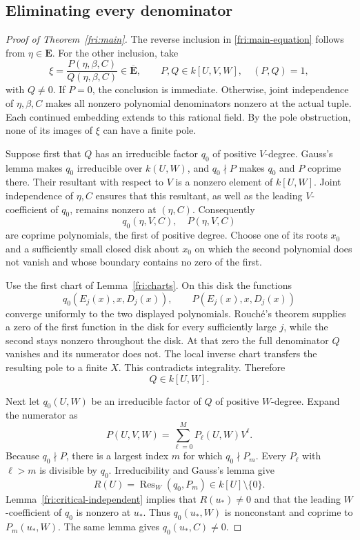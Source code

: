 \documentclass[11pt]{article}
\theoremstyle{definition}
\theoremstyle{remark}
\begin{document}
\subsection{Eliminating every denominator}

\begin{proof}[Proof of Theorem~\ref{fri:main}]
The reverse inclusion in \eqref{fri:main-equation} follows from
$\eta\in\mathbf E$.  For the other inclusion, take
\[
 \xi=\frac{P(\eta,\beta,C)}{Q(\eta,\beta,C)}
       \in\overline{\mathbf E},
 \qquad P,Q\in k[U,V,W],\quad (P,Q)=1,
\]
with $Q\ne0$.  If $P=0$, the conclusion is immediate.  Otherwise,
joint independence of $\eta,\beta,C$ makes all nonzero polynomial
denominators nonzero at the actual tuple.  Each continued embedding
extends to this rational field.  By the pole obstruction, none of
its images of $\xi$ can have a finite pole.

Suppose first that $Q$ has an irreducible factor $q_0$ of positive
$V$-degree.  Gauss's lemma makes $q_0$ irreducible over $k(U,W)$,
and $q_0\nmid P$ makes $q_0$ and $P$ coprime there.  Their resultant
with respect to $V$ is a nonzero element of $k[U,W]$.  Joint
independence of $\eta,C$ ensures that this resultant, as well as
the leading $V$-coefficient of $q_0$, remains nonzero at $(\eta,C)$.
Consequently
\[
 q_0(\eta,V,C),\quad P(\eta,V,C)
\]
are coprime polynomials, the first of positive degree.
Choose one of its roots $x_0$ and a sufficiently small closed disk
about $x_0$ on which the second polynomial does not vanish and whose
boundary contains no zero of the first.

Use the first chart of Lemma~\ref{fri:charts}.  On this disk the
functions
\[
 q_0(E_j(x),x,D_j(x)),\qquad P(E_j(x),x,D_j(x))
\]
converge uniformly to the two displayed polynomials.  Rouch\'e's
theorem supplies a zero of the first function in the disk for every
sufficiently large $j$, while the second stays nonzero throughout
the disk.  At that zero the full denominator $Q$ vanishes and its
numerator does not.  The local inverse chart transfers the resulting
pole to a finite $X$.  This contradicts integrality.  Therefore
\begin{equation}\label{fri:denom-no-beta}
 Q\in k[U,W].
\end{equation}

Next let $q_0(U,W)$ be an irreducible factor of $Q$ of positive
$W$-degree.  Expand the numerator as
\[
 P(U,V,W)=\sum_{\ell=0}^M P_\ell(U,W)V^\ell.
\]
Because $q_0\nmid P$, there is a largest index $m$ for which
$q_0\nmid P_m$.  Every $P_\ell$ with $\ell>m$ is divisible by
$q_0$.  Irreducibility and Gauss's lemma give
\[
 R(U)=\operatorname{Res}_W(q_0,P_m)\in k[U]\setminus\{0\}.
\]
Lemma~\ref{fri:critical-independent} implies that $R(u_*)\ne0$ and
that the leading $W$-coefficient of $q_0$ is nonzero at $u_*$.
Thus $q_0(u_*,W)$ is nonconstant and coprime to $P_m(u_*,W)$.
The same lemma gives $q_0(u_*,C)\ne0$.


\end{proof}
\end{document}
